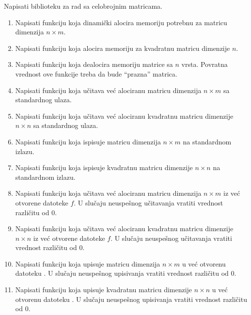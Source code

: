 \begin{Exercise}[label=2_19]
Napisati biblioteku za rad sa celobrojnim matricama. 
\begin{enumerate}
\item Napisati funkciju 
  koja dinamički alocira memoriju potrebnu za matricu dimenzija $n
  \times m$.
\item Napisati funkciju  koja alocira memoriju za kvadratnu matricu dimenzije $n$.
\item Napisati funkciju  koja dealocira memoriju matrice sa $n$ vrsta. Povratna vrednost
  ove funkcije treba da bude ``prazna'' matrica.
\item Napisati funkciju  koja učitava već alociranu matricu dimenzija $n \times m$ sa
  standardnog ulaza.
\item Napisati funkciju  koja učitava već alociranu kvadratnu matricu dimenzije
  $n \times n$ sa standardnog ulaza.
\item Napisati funkciju  koja ispisuje matricu dimenzija $n \times m$ na standardnom
  izlazu.
\item Napisati funkciju  koja ispisuje kvadratnu matricu dimenzije $n \times n$ na
  standardnom izlazu.
\item Napisati funkciju  koja učitava već alociranu matricu
  dimenzija $n \times m$ iz već otvorene datoteke $f$. U slučaju
  neuspešnog učitavanja vratiti vrednost različitu od $0$.
\item Napisati funkciju 
  koja učitava već alociranu kvadratnu matricu dimenzije $n \times n$ iz već
  otvorene datoteke $f$.  U slučaju neuspešnog učitavanja vratiti
  vrednost različitu od $0$.
\item Napisati funkciju  koja upisuje matricu dimenzija $n
  \times m$ u već otvorenu datoteku . U slučaju neuspešnog
  upisivanja vratiti vrednost različitu od $0$.
\item Napisati funkciju 
  koja upisuje kvadratnu matricu dimenzije $n \times n$ u već otvorenu datoteku
  . U slučaju neuspešnog upisivanja vratiti vrednost različitu od
  $0$.
\end{enumerate}


\end{Exercise}
